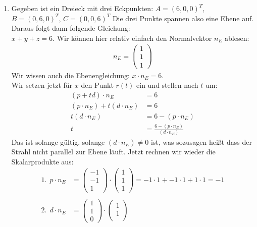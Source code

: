 \documentclass[11pt]{article}
\begin{document}
\begin{enumerate}
\begin{align*}
\begin{pmatrix*}
    1
  \end{pmatrix*}
\end{align*} \\
\item Gegeben ist ein Dreieck mit drei Eckpunkten: $A = (6, 0, 0) ^T$, $B = (0, 6, 0)^T$, $C = (0, 0, 6)^T$
Die drei Punkte spannen also eine Ebene auf. Daraus folgt dann folgende Gleichung: \\$x+y+z = 6$. Wir können hier relativ einfach den Normalvektor $n_E$ ablesen: \begin{align*}
    n_E = \begin{pmatrix*}
      1\\
      1\\
      1
    \end{pmatrix*}
\end{align*}
Wir wissen auch die Ebenengleichung: $x \cdot n_E = 6$. \\
Wir setzen jetzt für $x$ den Punkt $r(t)$ ein und stellen nach $t$ um: 
\begin{align*}
  (p + td) \cdot n_E &= 6 \\
  (p \cdot n_E) + t(d \cdot n_E) &= 6 \\
  t(d \cdot n_E) &= 6 - (p \cdot n_E) \\
  t &= \frac{6 - (p \cdot n_E)}{(d \cdot n_E)}
\end{align*}
Das ist solange gültig, solange $(d \cdot n_E) \neq 0$ ist, was sozusagen heißt dass der Strahl nicht parallel zur Ebene läuft. Jetzt rechnen wir wieder die Skalarprodukte aus:
\begin{align*}
  1.~~p \cdot n_E &= \begin{pmatrix*}
    -1\\
    -1\\
    1
  \end{pmatrix*} \cdot \begin{pmatrix*}
    1\\
    1\\
    1
  \end{pmatrix*} = -1 \cdot 1 + -1 \cdot 1 + 1 \cdot 1 = -1 \\ \\
  2.~~d \cdot n_E &= \begin{pmatrix*}
    1\\
    1\\
    0
  \end{pmatrix*} \cdot \begin{pmatrix*}
    1\\
    1\\

\end{pmatrix*}
\end{align*}
\end{enumerate}
\end{document}
